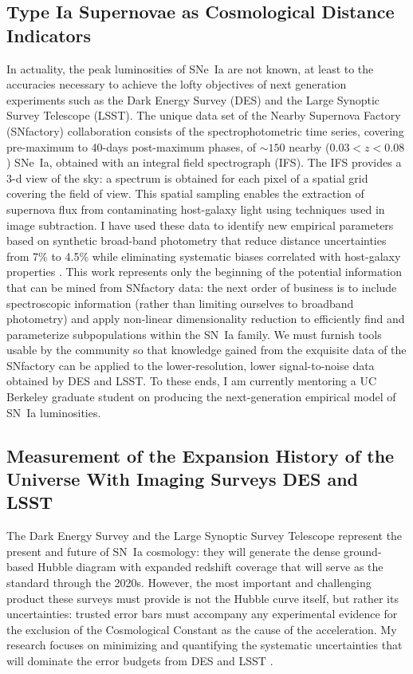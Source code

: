 \documentclass[12pt]{article}
\begin{document}
\subsection{Type Ia Supernovae as Cosmological Distance Indicators}
In actuality, the peak luminosities of SNe~Ia are not known, at least to the accuracies necessary
to achieve the lofty objectives of next generation experiments such as the Dark Energy Survey (DES) and the Large Synoptic
Survey Telescope (LSST).  The unique data set of
the Nearby Supernova Factory (SNfactory) collaboration consists of the spectrophotometric
time series, covering pre-maximum to 40-days post-maximum phases,
of  $\sim 150$ nearby ($0.03<z<0.08$) SNe~Ia, obtained with an integral field spectrograph (IFS).
The IFS provides a 3-d view of the sky: a spectrum is obtained for each pixel of a spatial grid covering
the field of view.   This spatial sampling enables the extraction of supernova flux from contaminating host-galaxy
light using  techniques used in image subtraction.
I have used these data  to identify new
empirical
parameters based on synthetic broad-band photometry that reduce distance uncertainties from 7\% to 4.5\% \cite{2013ApJ...766...84K}
while eliminating systematic biases correlated with host-galaxy
properties \cite{2014ApJ...784...51K}.  This work represents only the beginning of the
potential information that can be mined from  SNfactory data: the next order of business
is to include spectroscopic information (rather than limiting ourselves to broadband photometry)
and apply non-linear dimensionality reduction to efficiently find and parameterize
subpopulations   within the SN~Ia family.  We must furnish tools usable by the community so that
knowledge gained from the
exquisite data of the SNfactory can be applied to the lower-resolution, lower signal-to-noise data obtained
by DES and LSST.  To these ends, I am currently mentoring a UC Berkeley graduate student on producing the next-generation empirical
model of SN~Ia luminosities.

\subsection{Measurement of the Expansion History of the Universe With Imaging Surveys  DES and LSST}
The Dark Energy Survey and the Large Synoptic Survey Telescope represent the present and future of
SN~Ia cosmology: they
will generate the dense ground-based Hubble diagram with expanded redshift coverage that will serve as the standard 
through the 2020s.  However,
the most important and challenging product these surveys must provide is not the Hubble curve itself,
but rather its uncertainties: trusted error bars must accompany any experimental evidence for the exclusion
of the Cosmological
Constant as the cause of the acceleration. My research focuses on
minimizing and quantifying the
systematic uncertainties that will dominate the error budgets from DES and LSST \cite{2004MNRAS.347..909K}.  
\end{document}
